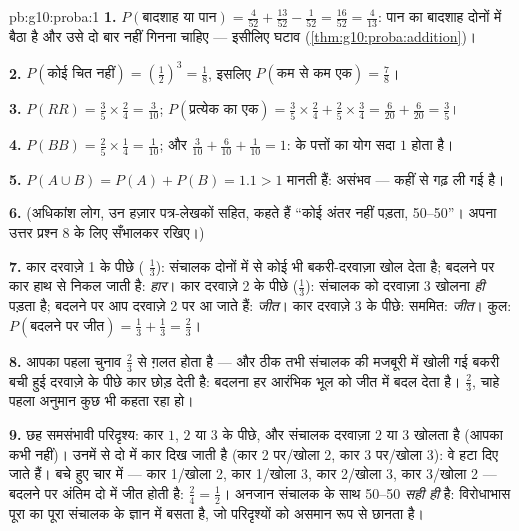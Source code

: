 \begin{solution}{pb:g10:proba:1}
\textbf{1.} $P(\text{बादशाह या पान}) = \frac{4}{52} +
\frac{13}{52} - \frac{1}{52} = \frac{16}{52} = \frac{4}{13}$: पान का बादशाह दोनों  में बैठा है और उसे दो बार नहीं
गिनना चाहिए --- इसीलिए घटाव (\cref{thm:g10:proba:addition})।

\textbf{2.} $P(\text{कोई चित नहीं}) = \left(\frac12\right)^3 =
\frac18$, इसलिए $P(\text{कम से कम एक}) = \frac78$।

\textbf{3.} $P(RR) = \frac35 \times \frac24 = \frac{3}{10}$; $P(\text{प्रत्येक का एक}) = \frac35 \times \frac24 + \frac25
\times \frac34 = \frac{6}{20} + \frac{6}{20} = \frac35$।

\textbf{4.} $P(BB) = \frac25 \times \frac14 = \frac1{10}$; और $\frac{3}{10} + \frac{6}{10} + \frac{1}{10} = 1$:  के पत्तों का योग सदा $1$ होता है।

\textbf{5.}   $P(A \cup B) = P(A) +
P(B) = 1.1 > 1$ मानती हैं: असंभव --- कहीं से  गढ़
ली गई है।

\textbf{6.} (अधिकांश लोग, उन हज़ार पत्र-लेखकों सहित, कहते हैं ``कोई अंतर
नहीं पड़ता, 50--50''। अपना उत्तर प्रश्न 8 के लिए सँभालकर रखिए।)

\textbf{7.} कार दरवाज़े 1 के पीछे ( $\frac13$): संचालक दोनों में से कोई
भी बकरी-दरवाज़ा खोल देता है; बदलने पर कार हाथ से निकल जाती है: \emph{हार}।
कार दरवाज़े 2 के पीछे ($\frac13$): संचालक को दरवाज़ा 3 खोलना \emph{ही} पड़ता है;
बदलने पर आप दरवाज़े 2 पर आ जाते हैं: \emph{जीत}। कार दरवाज़े 3 के पीछे:
सममित: \emph{जीत}। कुल: $P(\text{बदलने पर जीत}) = \frac13 + \frac13 = \frac23$।

\textbf{8.} आपका पहला चुनाव  $\frac23$ से ग़लत होता है --- और ठीक तभी
संचालक की मजबूरी में खोली गई बकरी बची हुई दरवाज़े के पीछे कार छोड़ देती है:
बदलना हर आरंभिक भूल को जीत में बदल देता है। $\frac23$, चाहे पहला अनुमान कुछ भी
कहता रहा हो।

\textbf{9.} छह समसंभावी परिदृश्य: कार $1$, $2$ या $3$ के पीछे, और
संचालक दरवाज़ा $2$ या $3$ खोलता है (आपका कभी नहीं)। उनमें से दो में कार
दिख जाती है (कार 2 पर/खोला 2, कार 3 पर/खोला 3): वे हटा दिए जाते हैं। बचे
हुए चार में --- कार 1/खोला 2, कार 1/खोला 3, कार 2/खोला 3, कार 3/खोला 2 ---
बदलने पर अंतिम दो में जीत होती है: $\frac24 = \frac12$। अनजान संचालक के साथ 50--50
\emph{सही ही} है: विरोधाभास पूरा का पूरा संचालक के ज्ञान में बसता है, जो
परिदृश्यों को असमान रूप से छानता है।


\end{solution}
